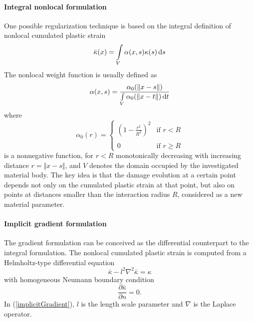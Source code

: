 \documentclass[a4paper]{article}
\begin{document}
\paragraph{Integral nonlocal formulation}
One possible regularization technique is based on the integral definition of nonlocal
  cumulated plastic strain
\begin{equation}\label{nonLocalPlStrain1}
\bar{\kappa}(x) = \int\limits_V \alpha(x,s)\kappa(s)\,{\rm d}s
\end{equation}
The nonlocal weight function is usually defined as
\begin{equation}
\alpha(x,s) = \frac{\alpha_0(\Vert x-s\Vert )}{\int\limits_V\alpha_0(\Vert x-t\Vert )\,{\rm d}t}
\end{equation}
where
\begin{equation}\label{alpha0}
\alpha_0(r) = \begin{cases} \left(1-\frac{r^2}{R^2}\right)^2 &\text{if $r<R$}\\ 
\\
0 & \text{if $r \ge R$}
\end{cases}
\end{equation}
is a nonnegative function, for $r<R$ monotonically decreasing with increasing distance $r=\Vert x-s\Vert$, and $V$ denotes the domain occupied by the investigated material body.
The key idea is that the damage evolution at a certain point depends not only on the cumulated plastic strain at that point, but also on points at distances smaller than the interaction radius $R$, considered as a new material parameter. 
\paragraph{Implicit gradient formulation}
The gradient formulation can be conceived as the differential counterpart to the integral formulation. The nonlocal cumulated plastic strain is computed from a Helmholtz-type differential equation 
\begin{equation}\label{implicitGradient}
\bar{\kappa} - l^2\nabla^2\bar{\kappa} = \kappa
\end{equation}
with homogeneous Neumann boundary condition
\begin{equation}\label{neumannBC}
\frac{\partial\bar{\kappa}}{\partial n} = 0.
\end{equation} In (\ref{implicitGradient}), $l$ is the length scale parameter and $\nabla$ is the Laplace operator. 
\end{document}
